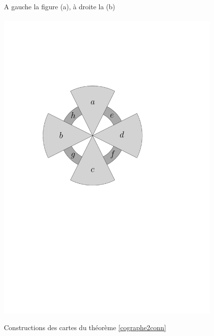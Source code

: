 \documentclass{scrartcl}
\begin{document}
\begin{flushleft}
\begin{figure}[h]
    \caption{Constructions des cartes du théorème \ref{cographe2conn}}\label{cographemap}
    \begin{center}
        A gauche la figure (a), à droite la (b)
        \\~\\
        \includegraphics[page = \ipeFigpointabuse, scale = 0.5]{figs}
        \hspace*{1.5cm}

\end{center}
\end{figure}
\end{flushleft}
\end{document}
